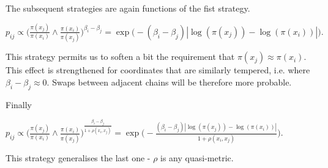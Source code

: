 	The subsequent strategies are again functions of the fist strategy.
	
\begin{strategy}[resume]
	\item $p_{ij} \propto \Big( \frac{\pi (x_j)}{\pi( x_i )} \wedge \frac{\pi (x_i)}{\pi( x_j )} \Big)^{\beta_i - \beta_j} = \exp \Big( - (\beta_i - \beta_j)| \log ( \pi(x_j) ) - \log ( \pi(x_i) ) | \Big).$ 
\end{strategy}
	
	This strategy permits us to soften a bit the requirement that $\pi(x_j) \approx \pi (x_i)$. This effect is strengthened for coordinates that are similarly tempered, i.e. where $\beta_i - \beta_j \approx 0$. Swaps between adjacent chains will be therefore more probable. 
	
	Finally
	
\begin{strategy}[resume]
	\item $p_{ij} \propto \Big( \frac{\pi (x_j)}{\pi( x_i )} \wedge \frac{\pi (x_i)}{\pi( x_j )} \Big)^\frac{\beta_i - \beta_j}{1 + \rho(x_i, x_j)} = \exp \Big( - \frac{(\beta_i - \beta_j)| \log ( \pi(x_j) ) - \log ( \pi(x_i) ) |}{{1 + \rho(x_i, x_j)}} \Big).$
\end{strategy} 

	This strategy generalises the last one - $\rho$ is any quasi-metric. 